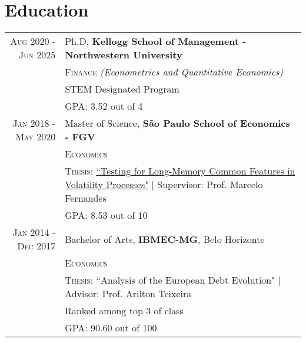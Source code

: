 \documentclass[a4paper,10pt]{article}
\begin{document}
\section{Education}
\begin{tabular}{r|p{8.75cm}}	
    \textsc{Aug} 2020 - \textsc{Jun} 2025 & Ph.D, \normalsize\textbf{Kellogg School of Management - Northwestern University} \\
    & \textsc{Finance} \textit{(Econometrics and Quantitative Economics)} \\
    & \normalsize \textsc{STEM} Designated Program \\
    & \normalsize \textsc{GPA}: 3.52 out of 4 \\
    \textsc{Jan} 2018 - \textsc{May} 2020 & Master of Science, \normalsize\textbf{São Paulo School of Economics - FGV} \\
    & \textsc{Economics} \\
    & \normalsize \textsc{Thesis}: \href{http://hdl.handle.net/10438/29188}{``Testing for Long-Memory Common Features in Volatility Processes"} | \small Supervisor: Prof. Marcelo Fernandes \\ 
    &\normalsize \textsc{GPA}: 8.53 out of 10
    \\
    \textsc{Jan} 2014 - \textsc{Dec} 2017& Bachelor of Arts, \normalsize\textbf{IBMEC-MG}, Belo Horizonte \\
    & \textsc{Economics} \\
    & \normalsize \textsc{Thesis}: ``Analysis of the European Debt Evolution" | \small Advisor: Prof. Arilton Teixeira \\
    & \normalsize{Ranked among top 3 of class} \\
    &\normalsize \textsc{GPA}: 90.60 out of 100
\end{tabular}

\end{document}
